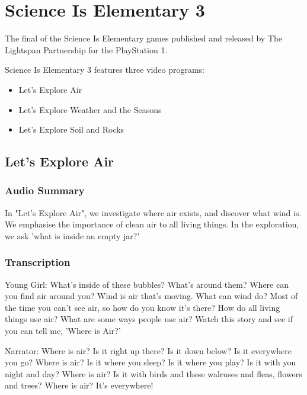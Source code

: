 \chapter{Science Is Elementary 3}


The final of the Science Is Elementary games published and released by The Lightspan Partnership for the PlayStation 1.

Science Is Elementary 3 features three video programs:

\begin{itemize}
    \item Let's Explore Air
    \item Let's Explore Weather and the Seasons
    \item Let's Explore Soil and Rocks
\end{itemize}

\clearpage
\newpage

\section{Let's Explore Air}

\subsection{Audio Summary}

In "Let's Explore Air", we investigate where air exists, and discover what wind is. We emphasise the importance of clean air to all living things. In the exploration, we ask 'what is inside an empty jar?'

\subsection{Transcription}

Young Girl: What's inside of these bubbles? What's around them? Where can you find air around you? Wind is air that's moving. What can wind do? Most of the time you can't see air, so how do you know it's there? How do all living things use air? What are some ways people use air? Watch this story and see if you can tell me, 'Where is Air?'

Narrator: Where is air? Is it right up there? Is it down below? Is it everywhere you go? Where is air? Is it where you sleep? Is it where you play? Is it with you night and day? Where is air? Is it with birds and these walruses and fleas, flowers and trees? Where is air? It's everywhere!

